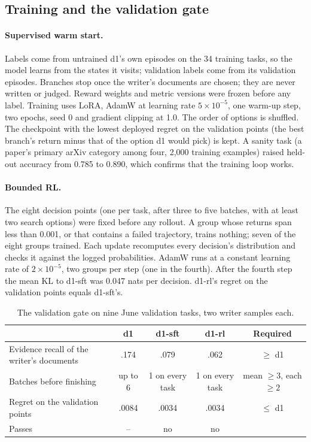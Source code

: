 \documentclass[11pt, letterpaper]{article}
\begin{document}
\subsection{Training and the validation gate}
\label{app:training}

\paragraph{Supervised warm start.} Labels come from untrained d1's own episodes on the 34 training
tasks, so the model learns from the states it visits; validation labels come from its validation
episodes. Branches stop once the writer's documents are chosen; they are never written or judged.
Reward weights and metric versions were frozen before any label. Training uses LoRA, AdamW at
learning rate $5\times10^{-5}$, one warm-up step, two epochs, seed 0 and gradient clipping at 1.0.
The order of options is shuffled. The checkpoint with the lowest deployed regret on the validation
points (the best branch's return minus that of the option d1 would pick) is kept. A sanity task
(a paper's primary arXiv category among four, 2,000 training examples) raised held-out accuracy from
0.785 to 0.890, which confirms that the training loop works.

\paragraph{Bounded RL.} The eight decision points (one per task, after three to five batches, with at
least two search options) were fixed before any rollout. A group whose returns span less than 0.001,
or that contains a failed trajectory, trains nothing; seven of the eight groups trained. Each update
recomputes every decision's distribution and checks it against the logged probabilities. AdamW runs
at a constant learning rate of $2\times10^{-5}$, two groups per step (one in the fourth). After the fourth step the mean
KL to d1-sft was 0.047 nats per decision. d1-rl's regret on the validation points equals d1-sft's.

\begin{table}[H]
\centering\footnotesize\setlength{\tabcolsep}{3pt}
\begin{tabular}{lcccc}
\toprule
& d1 & d1-sft & d1-rl & Required\\
\midrule
Evidence recall of the writer's documents & .174 & .079 & .062 & $\ge$ d1\\
Batches before finishing & up to 6 & 1 on every task & 1 on every task & mean $\ge 3$, each $\ge 2$\\
Regret on the validation points & .0084 & .0034 & .0034 & $\le$ d1\\
Passes & -- & no & no & \\
\bottomrule
\end{tabular}
\caption{The validation gate on nine June validation tasks, two writer samples each.}
\end{table}
\end{document}

